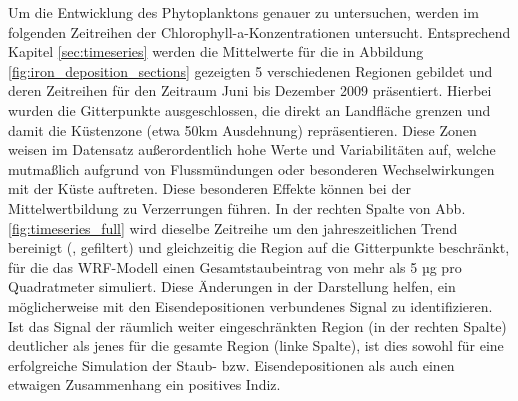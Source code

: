 \documentclass[12pt,a4paper,onecolumn]{scrartcl}
\begin{document}
Um die Entwicklung des Phytoplanktons genauer zu untersuchen, werden im folgenden Zeitreihen der Chlorophyll-a-Konzentrationen untersucht. Entsprechend Kapitel \ref{sec:timeseries} werden die Mittelwerte für die in Abbildung \ref{fig:iron_deposition_sections} gezeigten 5 verschiedenen Regionen gebildet und deren Zeitreihen für den Zeitraum Juni bis Dezember 2009 präsentiert. Hierbei wurden die Gitterpunkte ausgeschlossen, die direkt an Landfläche grenzen und damit die Küstenzone (etwa 50km Ausdehnung) repräsentieren. Diese Zonen weisen im Datensatz außerordentlich hohe Werte und Variabilitäten auf, welche mutmaßlich aufgrund von Flussmündungen oder besonderen Wechselwirkungen mit der Küste auftreten. Diese besonderen Effekte können bei der Mittelwertbildung zu Verzerrungen führen. In der rechten Spalte von Abb. \ref{fig:timeseries_full} wird dieselbe Zeitreihe um den jahreszeitlichen Trend bereinigt (, gefiltert) und gleichzeitig die Region auf die Gitterpunkte beschränkt, für die das WRF-Modell einen Gesamtstaubeintrag von mehr als 5 µg pro Quadratmeter simuliert. Diese Änderungen in der Darstellung helfen, ein möglicherweise mit den Eisendepositionen verbundenes Signal zu identifizieren. Ist das Signal der räumlich weiter eingeschränkten Region (in der rechten Spalte) deutlicher als jenes für die gesamte Region (linke Spalte), ist dies sowohl für eine erfolgreiche Simulation der Staub- bzw. Eisendepositionen als auch einen etwaigen Zusammenhang ein positives Indiz. 
\end{document}
